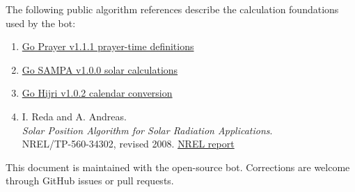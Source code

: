 \documentclass[11pt,a4paper]{article}
\begin{document}
The following public algorithm references describe the calculation foundations used by the bot:

\begin{enumerate}
  \item \href{https://github.com/hablullah/go-prayer/tree/v1.1.1}{Go Prayer v1.1.1 prayer-time definitions}
  \item \href{https://github.com/hablullah/go-sampa/tree/v1.0.0}{Go SAMPA v1.0.0 solar calculations}
  \item \href{https://github.com/hablullah/go-hijri/tree/v1.0.2}{Go Hijri v1.0.2 calendar conversion}
  \item I. Reda and A. Andreas.\\
  \emph{Solar Position Algorithm for Solar Radiation Applications}.\\
  NREL/TP-560-34302, revised 2008. \href{https://docs.nrel.gov/docs/fy08osti/34302.pdf}{NREL report}
\end{enumerate}

\vfill
\begin{center}
\small\color{muted}This document is maintained with the open-source bot. Corrections are welcome through GitHub issues or pull requests.
\end{center}
\end{document}
